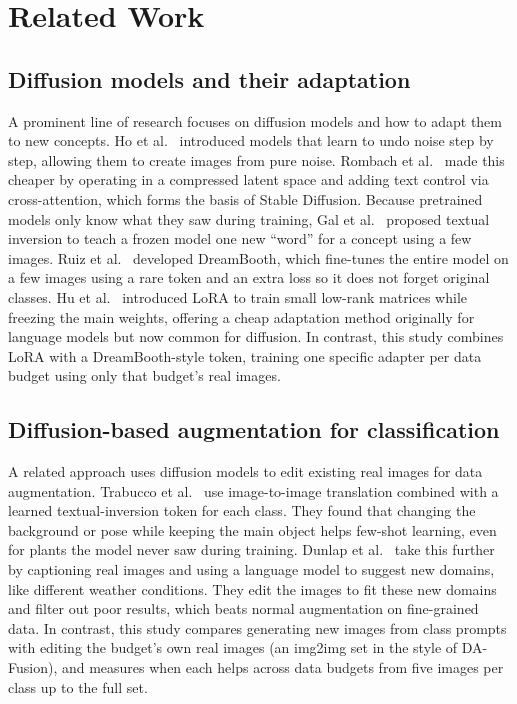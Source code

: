 \section{Related Work}
\label{sec:related}


\subsection{Diffusion models and their adaptation}
A prominent line of research focuses on diffusion models and how to adapt them to new concepts. Ho et al.~\cite{ho2020denoising} introduced models that learn to undo noise step by step, allowing them to create images from pure noise. Rombach et al.~\cite{rombach2022high} made this cheaper by operating in a compressed latent space and adding text control via cross-attention, which forms the basis of Stable Diffusion. Because pretrained models only know what they saw during training, Gal et al.~\cite{gal2023image} proposed textual inversion to teach a frozen model one new ``word'' for a concept using a few images. Ruiz et al.~\cite{ruiz2023dreambooth} developed DreamBooth, which fine-tunes the entire model on a few images using a rare token and an extra loss so it does not forget original classes. Hu et al.~\cite{hu2022lora} introduced LoRA to train small low-rank matrices while freezing the main weights, offering a cheap adaptation method originally for language models but now common for diffusion. In contrast, this study combines LoRA with a DreamBooth-style token, training one specific adapter per data budget using only that budget's real images.

\subsection{Diffusion-based augmentation for classification}
A related approach uses diffusion models to edit existing real images for data augmentation. Trabucco et al.~\cite{trabucco2024effective} use image-to-image translation combined with a learned textual-inversion token for each class. They found that changing the background or pose while keeping the main object helps few-shot learning, even for plants the model never saw during training. Dunlap et al.~\cite{dunlap2023diversify} take this further by captioning real images and using a language model to suggest new domains, like different weather conditions. They edit the images to fit these new domains and filter out poor results, which beats normal augmentation on fine-grained data. In contrast, this study compares generating new images from class prompts with editing the budget's own real images (an img2img set in the style of DA-Fusion), and measures when each helps across data budgets from five images per class up to the full set.

